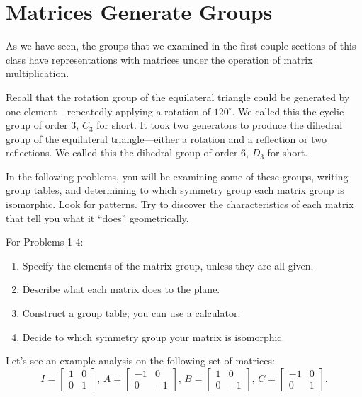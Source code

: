 \documentclass[../gatm.tex]{subfiles}
\begin{document}
\section{Matrices Generate Groups}
\setcounter{problem_i}{0}

As we have seen, the groups that we examined in the first couple sections of this class have representations with matrices under the operation of matrix multiplication.

Recall that the rotation group of the equilateral triangle could be generated by one element---repeatedly applying a rotation of $120^\circ$. We called this the cyclic group of order $3$, $C_3$ for short. It took two generators to produce the dihedral group of the equilateral triangle---either a rotation and a reflection or two reflections. We called this the dihedral group of order $6$, $D_3$ for short.

In the following problems, you will be examining some of these groups, writing group tables, and determining to which symmetry group each matrix group is isomorphic. Look for patterns. Try to discover the characteristics of each matrix that tell you what it ``does'' geometrically.

For Problems 1-4:
\begin{enumerate}[label=(\alph*)]
\item Specify the elements of the matrix group, unless they are all given.
\item Describe what each matrix does to the plane.
\item Construct a group table; you can use a calculator.
\item Decide to which symmetry group your matrix is isomorphic.
\end{enumerate}
\vspace{1cm}

Let's see an example analysis on the following set of matrices:
$$I=\left[\begin{array}{cc} 1 & 0 \\ 0 & 1 \end{array}\right],\, A=\left[\begin{array}{cc} -1 & 0 \\ 0 & -1 \end{array}\right],\,  B=\left[\begin{array}{cc} 1 & 0 \\ 0 & -1 \end{array}\right],\, C=\left[\begin{array}{cc} -1 & 0 \\ 0 & 1 \end{array}\right].$$
\end{document}
